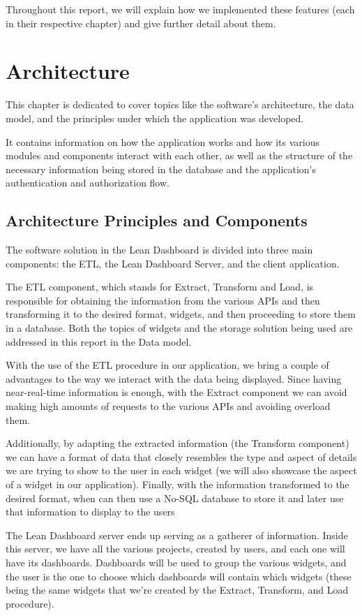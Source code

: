 \documentclass[a4paper,twoside,10pt]{report}
\begin{document}
Throughout this report, we will explain how we implemented these features (each in their respective chapter) and give further detail about them.

\chapter{Architecture}
This chapter is dedicated to cover topics like the software's architecture, the data model, and the principles under which the application was developed. 

It contains information on how the application works and how its various modules and components interact with each other, as well as the structure of the necessary information being stored in the database and the application's authentication and authorization flow.
\section{Architecture Principles and Components}
The software solution in the Lean Dashboard is divided into three main components: the ETL\cite{ETLPROC}, the Lean Dashboard Server, and the client application.
 
The ETL component, which stands for Extract, Transform and Load, is responsible for obtaining the information from the various APIs and then transforming it to the desired format, widgets, and then proceeding to store them in a database. Both the topics of widgets and the storage solution being used are addressed in this report in the Data model.
 
With the use of the ETL procedure in our application, we bring a couple of advantages to the way we interact with the data being displayed. Since having near-real-time information is enough, with the Extract component we can avoid making high amounts of requests to the various APIs and avoiding overload them.
 
Additionally, by adapting the extracted information (the Transform component) we can have a format of data that closely resembles the type and aspect of details we are trying to show to the user in each widget (we will also showcase the aspect of a widget in our application). Finally, with the information transformed to the desired format, when can then use a No-SQL database to store it and later use that information to display to the users 
 
The Lean Dashboard server ends up serving as a gatherer of information. Inside this server, we have all the various projects, created by users, and each one will have its dashboards. Dashboards will be used to group the various widgets, and the user is the one to choose which dashboards will contain which widgets (these being the same widgets that we're created by the Extract, Transform, and Load procedure).
 
\end{document}
